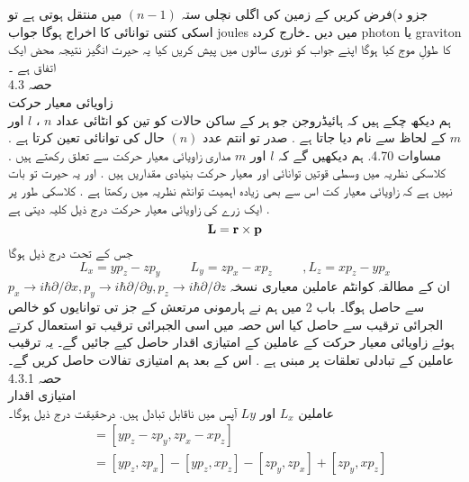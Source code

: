 \documentclass{book}
\begin{document}
جزو د)فرض کریں کے زمین کی اگلی نچلی ستہ 
\((n-1)\)
میں منتقل ہوتی ہے تو اسکی کتنی توانائی کا اخراج ہوگا جواب joules  میں دیں ۔خارج کردہ photon یا graviton کا طولِ موج کیا ہوگا اپنے جواب کو نوری سالوں میں پیش کریں کیا یہ حیرت انگیز نتیجہ محض ایک اتفاق ہے ۔\\
حصہ 
4.3\\
زاویائی معیار حرکت\\
ہم دیکھ چکے ہیں کہ ہائیڈروجن جو ہر کے ساکن حالات کو تین کو انٹائی عداد
\(n\)
،
\(l\)
اور
\(m\)
کے لحاظ سے نام دیا جاتا ہے . صدر تو انتم عدد
\((n)\)
حال
کی توانائی تعین کرتا ہے . مساوات 4.70.
ہم دیکھیں گے کہ
\(l\)
اور
\(m\)
مداری زاویائی معیار حرکت سے تعلق رکھتے ہیں . کلاسکی نظریہ میں وسطی قوتیں توانائی اور معیار حرکت بنیادی مقداریں ہیں . اور یہ حیرت تو بات نہیں ہے کہ زاویائی معیار کت اس سے بھی زیادہ اہمیت توانٹم نظریہ میں رکھتا ہے . کلاسکی طور پر ایک زرے کی زاویائی معیار حرکت درج ذیل کلیہ دیتی ہے .\\
\[\text{\textbf{L}}=\text{\textbf{r}}\times\text{\textbf{p}}\]
جس کے تحت درج ذیل ہوگا\\
\[L_{x}=yp_{z}-zp_{y} \hspace{1cm} L_{y}=zp_{x}-xp_{z} \hspace{1cm},L_{z}=xp_{z}-yp_{x}\]
ان کے مطالقہ کوانٹم عاملین معیاری نسخہ
\(p_{x}\rightarrow i\hbar\partial/\partial{x},p_{y}\rightarrow i\hbar\partial/\partial{y},p_{z}\rightarrow i\hbar\partial/\partial{z}\)
سے حاصل ہوگا۔ باب 2 میں ہم نے ہارمونی مرتعش کے جز تی توانایوں کو خالص الجرائی ترقیب سے حاصل کیا اس حصہ میں اسی الجبرائی ترقیب تو استعمال کرتے ہوئے زاویائی معیار حرکت کے عاملین کے امتیازی اقدار حاصل کیے جائیں گے۔ یہ ترقیب عاملین کے تبادلی تعلقات پر مبنی ہے . اس کے بعد ہم امتیازی تفالات حاصل کریں گے۔\\
حصہ 
4.3.1\\
امتیازی اقدار\\
عاملین
\(L_{x}\)
اور
\(L{y}\)
آپس میں ناقابل تبادل ہیں. درحقیقت درج ذیل ہوگا۔\\
\begin{align*}
[L_{x},L_{y}]&=[yp_{z}-zp_{y},zp_{x}-xp_{z}]\\
&=[yp_{z},zp_{x}]-[yp_{z},xp_{z}]-[zp_{y},zp_{x}]+[zp_{y},xp_{z}]\\
\end{align*}
\end{document}
